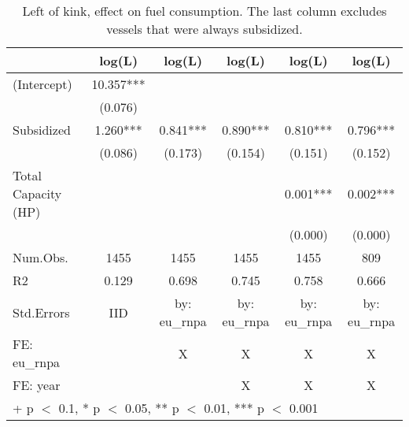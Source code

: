 \begin{table}

\caption{\label{tab:}Left of kink, effect on fuel consumption. The last column excludes vessels that were always subsidized.}
\centering
\begin{tabular}[t]{lccccc}
\toprule
  & log(L) & log(L)  & log(L)   & log(L)    & log(L)    \\
\midrule
(Intercept) & \num{10.357}*** &  &  &  & \\
 & (\num{0.076}) &  &  &  & \\
Subsidized & \num{1.260}*** & \num{0.841}*** & \num{0.890}*** & \num{0.810}*** & \num{0.796}***\\
 & (\num{0.086}) & (\num{0.173}) & (\num{0.154}) & (\num{0.151}) & (\num{0.152})\\
Total Capacity (HP) &  &  &  & \num{0.001}*** & \num{0.002}***\\
 &  &  &  & (\num{0.000}) & (\num{0.000})\\
\midrule
Num.Obs. & \num{1455} & \num{1455} & \num{1455} & \num{1455} & \num{809}\\
R2 & \num{0.129} & \num{0.698} & \num{0.745} & \num{0.758} & \num{0.666}\\
Std.Errors & IID & by: eu\_rnpa & by: eu\_rnpa & by: eu\_rnpa & by: eu\_rnpa\\
FE: eu_rnpa &  & X & X & X & X\\
FE: year &  &  & X & X & X\\
\bottomrule
\multicolumn{6}{l}{\rule{0pt}{1em}+ p $<$ 0.1, * p $<$ 0.05, ** p $<$ 0.01, *** p $<$ 0.001}\\
\end{tabular}
\end{table}
